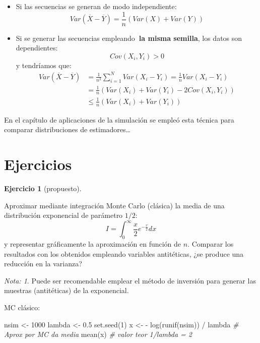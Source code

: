 \documentclass[
]{book}
\newenvironment{Shaded}{\begin{snugshade}}{\end{snugshade}}
\newcommand{\CommentTok}[1]{\textcolor[rgb]{0.56,0.35,0.01}{\textit{#1}}}
\newcommand{\DecValTok}[1]{\textcolor[rgb]{0.00,0.00,0.81}{#1}}
\newcommand{\FloatTok}[1]{\textcolor[rgb]{0.00,0.00,0.81}{#1}}
\newcommand{\FunctionTok}[1]{\textcolor[rgb]{0.00,0.00,0.00}{#1}}
\newcommand{\NormalTok}[1]{#1}
\newcommand{\OtherTok}[1]{\textcolor[rgb]{0.56,0.35,0.01}{#1}}
\newcommand{\SpecialCharTok}[1]{\textcolor[rgb]{0.00,0.00,0.00}{#1}}
\theoremstyle{break}
\theoremstyle{definition}
\theoremstyle{definition}
\theoremstyle{definition}
\newtheorem{exercise}{Ejercicio}[chapter]
\theoremstyle{definition}
\theoremstyle{remark}
\newtheorem*{remark}{Nota: }
\begin{document}
\begin{itemize}
\item
  Si las secuencias se generan de modo independiente:
  \[Var\left( \overline{X} - \overline{Y} \right) 
  = \frac{1}{n} \left( Var\left( X \right) + Var\left( Y \right) \right)\]
\item
  Si se generar las secuencias empleando\textbf{~la misma semilla},
  los datos son dependientes:
  \[Cov\left( X_{i}, Y_{i} \right) > 0\]
  y tendríamos que:
  \[\begin{aligned}
  Var\left( \overline{X}-\overline{Y}\right)  &
  = \frac{1}{n^{2}}\sum_{i=1}^{N}Var\left( X_{i}-Y_{i}\right) 
  = \frac{1}{n}Var\left( X_{i}-Y_{i}\right) \\
  & = \frac{1}{n}\left( Var\left( X_{i} \right) + Var\left( Y_{i} \right)
  - 2Cov\left( X_{i},Y_{i} \right) \right) \\
  & \leq \frac{1}{n}\left( Var\left( X_{i} \right) 
  + Var\left( Y_{i}\right) \right)
  \end{aligned}\]
\end{itemize}

En el capítulo de aplicaciones de la simulación se empleó esta técnica para comparar distribuciones de estimadores\ldots{}

\hypertarget{ejercicios-2}{%
\section{Ejercicios}\label{ejercicios-2}}

\begin{exercise}[propuesto]
\protect\hypertarget{exr:mc-int-ainv}{}{\label{exr:mc-int-ainv} {} }
\end{exercise}

Aproximar mediante integración Monte Carlo (clásica) la media de una distribución exponencial de parámetro \(1/2\):
\[I=\int_{0}^{\infty}\frac{x}{2}e^{-\frac{x}{2}}dx\]
y representar gráficamente la aproximación en función de \(n\).
Comparar los resultados con los obtenidos empleando variables antitéticas,
¿se produce una reducción en la varianza?

\begin{remark}
{}Puede ser recomendable emplear el método de inversión para generar las
muestras (antitéticas) de la exponencial.
\end{remark}

MC clásico:

\begin{Shaded}
\begin{Highlighting}[]
\NormalTok{nsim }\OtherTok{\textless{}{-}} \DecValTok{1000}
\NormalTok{lambda }\OtherTok{\textless{}{-}} \FloatTok{0.5}
\FunctionTok{set.seed}\NormalTok{(}\DecValTok{1}\NormalTok{)}
\NormalTok{x }\OtherTok{\textless{}{-}} \SpecialCharTok{{-}} \FunctionTok{log}\NormalTok{(}\FunctionTok{runif}\NormalTok{(nsim)) }\SpecialCharTok{/}\NormalTok{ lambda}
\CommentTok{\# Aprox por MC da media }
\FunctionTok{mean}\NormalTok{(x) }\CommentTok{\# valor teor 1/lambda = 2}
\end{Highlighting}
\end{Shaded}
\end{document}
